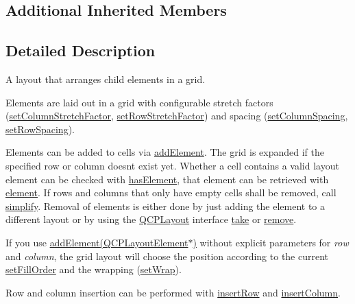 \subsection*{Additional Inherited Members}


\subsection{Detailed Description}
A layout that arranges child elements in a grid. 

Elements are laid out in a grid with configurable stretch factors (\hyperlink{class_q_c_p_layout_grid_ae38f31a71687b9d7ee3104852528fb50}{set\+Column\+Stretch\+Factor}, \hyperlink{class_q_c_p_layout_grid_a7b0273de5369bd93d942edbaf5b166ec}{set\+Row\+Stretch\+Factor}) and spacing (\hyperlink{class_q_c_p_layout_grid_a3a49272aba32bb0fddc3bb2a45a3dba0}{set\+Column\+Spacing}, \hyperlink{class_q_c_p_layout_grid_aaef2cd2d456197ee06a208793678e436}{set\+Row\+Spacing}).

Elements can be added to cells via \hyperlink{class_q_c_p_layout_grid_adff1a2ca691ed83d2d24a4cd1fe17012}{add\+Element}. The grid is expanded if the specified row or column doesn\textquotesingle{}t exist yet. Whether a cell contains a valid layout element can be checked with \hyperlink{class_q_c_p_layout_grid_ab0cf4f7edc9414a3bfaddac0f46dc0a0}{has\+Element}, that element can be retrieved with \hyperlink{class_q_c_p_layout_grid_a602b426609b4411cf6a93c3ddf3a381a}{element}. If rows and columns that only have empty cells shall be removed, call \hyperlink{class_q_c_p_layout_grid_a38621ca7aa633b6a9a88617df7f08672}{simplify}. Removal of elements is either done by just adding the element to a different layout or by using the \hyperlink{class_q_c_p_layout}{Q\+C\+P\+Layout} interface \hyperlink{class_q_c_p_layout_grid_aee961c2eb6cf8a85dcbc5a7d7b6c1a00}{take} or \hyperlink{class_q_c_p_layout_a6c58f537d8086f352576ab7c5b15d0bc}{remove}.

If you use \hyperlink{class_q_c_p_layout_grid_a4c44025dd25acd27e053cadfd448ad7b}{add\+Element(\+Q\+C\+P\+Layout\+Element$\ast$)} without explicit parameters for {\itshape row} and {\itshape column}, the grid layout will choose the position according to the current \hyperlink{class_q_c_p_layout_grid_affc2f3cfd22f28698c5b29b960d2a391}{set\+Fill\+Order} and the wrapping (\hyperlink{class_q_c_p_layout_grid_ab36af18d77e4428386d02970382ee598}{set\+Wrap}).

Row and column insertion can be performed with \hyperlink{class_q_c_p_layout_grid_a48af3dd7c3a653d9c3d7dd99bd02e838}{insert\+Row} and \hyperlink{class_q_c_p_layout_grid_a1e880a321dbe8b43b471ccd764433dc4}{insert\+Column}. 

